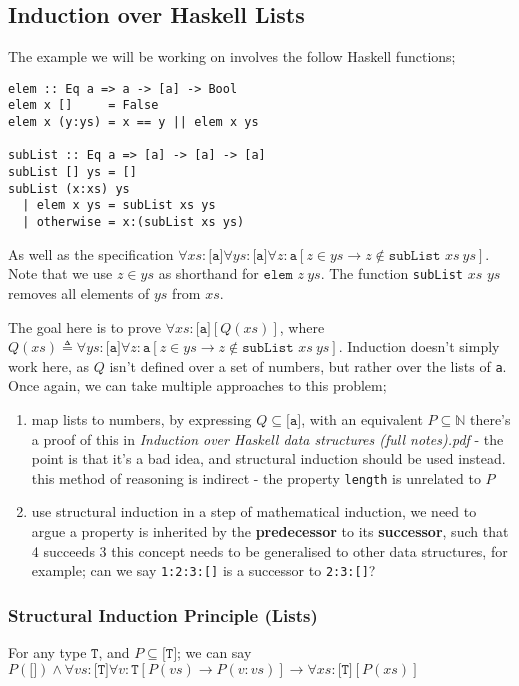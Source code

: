 \documentclass[a4paper, 12pt]{article}
\begin{document}
        \subsection*{Induction over Haskell Lists}
            The example we will be working on involves the follow Haskell functions;
            \begin{verbatim}
elem :: Eq a => a -> [a] -> Bool
elem x []     = False
elem x (y:ys) = x == y || elem x ys

subList :: Eq a => [a] -> [a] -> [a]
subList [] ys = []
subList (x:xs) ys
  | elem x ys = subList xs ys
  | otherwise = x:(subList xs ys)\end{verbatim}
            As well as the specification $\forall xs : \texttt{[a]} \forall ys : \texttt{[a]} \forall z : \texttt{a} [z \in ys \rightarrow z \not\in \texttt{subList } xs\ ys]$. Note that we use $z \in ys$ as shorthand for $\texttt{elem } z\ ys$. The function \texttt{subList} $xs$ $ys$ removes all elements of $ys$ from $xs$.
            \medskip

            The goal here is to prove $\forall xs : \texttt{[a]} [Q(xs)]$, where $Q(xs) \triangleq \forall ys : \texttt{[a]} \forall z : \texttt{a} [z \in ys \rightarrow z \not\in \texttt{subList }xs\ ys]$. Induction doesn't simply work here, as $Q$ isn't defined over a set of numbers, but rather over the lists of \texttt{a}. Once again, we can take multiple approaches to this problem;
            \begin{enumerate}[1.]
                \itemsep0em
                \item map lists to numbers, by expressing $Q \subseteq \texttt{[a]}$, with an equivalent $P \subseteq \mathbb{N}$
                    \subitem there's a proof of this in \textit{Induction over Haskell data structures (full notes).pdf} - the point is that it's a bad idea, and structural induction should be used instead.
                    \subitem this method of reasoning is indirect - the property \texttt{length} is unrelated to $P$
                \item use structural induction
                    \subitem in a step of mathematical induction, we need to argue a property is inherited by the \textbf{predecessor} to its \textbf{successor}, such that 4 succeeds 3
                    \subitem this concept needs to be generalised to other data structures, for example; can we say \texttt{1:2:3:[]} is a successor to \texttt{2:3:[]}?
            \end{enumerate}
            \subsubsection*{Structural Induction Principle (Lists)}
                For any type $\texttt{T}$, and $P \subseteq \texttt{[T]}$; we can say $P(\texttt{[]}) \land \forall vs : \texttt{[T]} \forall v : \texttt{T} [P(vs) \rightarrow P(v : vs)] \rightarrow \forall xs : \texttt{[T]} [P(xs)]$
                \medskip
\end{document}

